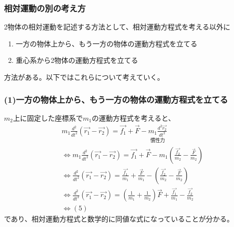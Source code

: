 \documentclass[dvipdfmx,11pt]{jsarticle}
\begin{document}
\subsubsection*{相対運動の別の考え方}
2物体の相対運動を記述する方法として、相対運動方程式を考える以外に
\begin{enumerate}[label=(\arabic*)]
    \item 一方の物体上から、もう一方の物体の運動方程式を立てる
    \item 重心系から2物体の運動方程式を立てる
\end{enumerate}
方法がある。以下ではこれらについて考えていく。

\subsubsection*{(1)一方の物体上から、もう一方の物体の運動方程式を立てる}
$m_2$上に固定した座標系で$m_1$の運動方程式を考えると、
{\large
\begin{align*}
     & m_1\frac{d^2}{dt^2}\left(\vec{r_1}-\vec{r_2}\right)=\vec{f_1}+\vec{F}-\underset{\text{慣性力}}{\boxed{m_1\frac{d^2\vec{r_2}}{dt^2}}}
    \\&\Leftrightarrow m_1\frac{d^2}{dt^2}\left(\vec{r_1}-\vec{r_2}\right)=\vec{f_1}+\vec{F}-m_1\left(\frac{\vec{f_2}}{m_2}-\frac{\vec{F}}{m_2}\right)
    \\&\Leftrightarrow\frac{d^2}{dt^2}\left(\vec{r_1}-\vec{r_2}\right)=\frac{\vec{f_1}}{m_1}+\frac{\vec{F}}{m_1}-\left(\frac{\vec{f_2}}{m_2}-\frac{\vec{F}}{m_2}\right)
    \\&\Leftrightarrow\frac{d^2}{dt^2}\left(\vec{r_1}-\vec{r_2}\right)=\left(\frac{1}{m_1}+\frac{1}{m_2}\right)\vec{F}+\frac{\vec{f_1}}{m_1}-\frac{\vec{f_2}}{m_2}
    \\&\Leftrightarrow(5)
\end{align*}
}
であり、相対運動方程式と数学的に同値な式になっていることが分かる。
\end{document}
